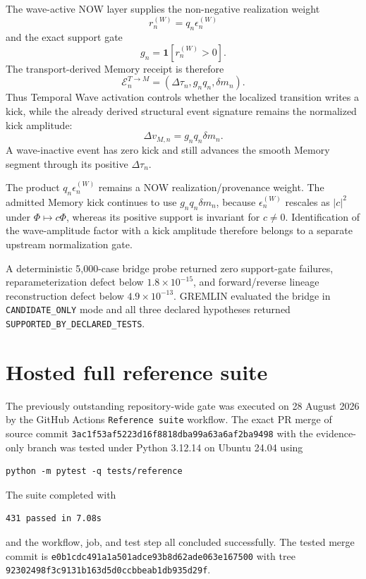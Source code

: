 \documentclass[11pt]{book}
\begin{document}
The wave-active NOW layer supplies the non-negative realization weight
\[
r_n^{(W)}=q_n\epsilon_n^{(W)}
\]
and the exact support gate
\[
g_n=\mathbf 1[r_n^{(W)}>0].
\]
The transport-derived Memory receipt is therefore
\[
\boxed{
\mathcal E_n^{T\to M}
=(\Delta\tau_n,g_nq_n,\delta m_n).
}
\]
Thus Temporal Wave activation controls whether the localized transition writes a kick, while the already derived structural event signature remains the normalized kick amplitude:
\[
\boxed{
\Delta v_{M,n}=g_nq_n\delta m_n.
}
\]
A wave-inactive event has zero kick and still advances the smooth Memory segment through its positive \(\Delta\tau_n\).

The product \(q_n\epsilon_n^{(W)}\) remains a NOW realization/provenance weight. The admitted Memory kick continues to use \(g_nq_n\delta m_n\), because \(\epsilon_n^{(W)}\) rescales as \(|c|^2\) under \(\Phi\mapsto c\Phi\), whereas its positive support is invariant for \(c\neq0\). Identification of the wave-amplitude factor with a kick amplitude therefore belongs to a separate upstream normalization gate.

A deterministic 5,000-case bridge probe returned zero support-gate failures, reparameterization defect below \(1.8\times10^{-15}\), and forward/reverse lineage reconstruction defect below \(4.9\times10^{-13}\). GREMLIN evaluated the bridge in \texttt{CANDIDATE\_ONLY} mode and all three declared hypotheses returned \texttt{SUPPORTED\_BY\_DECLARED\_TESTS}.

\section{Hosted full reference suite}

The previously outstanding repository-wide gate was executed on 28 August 2026 by the GitHub Actions \texttt{Reference suite} workflow. The exact PR merge of source commit
\texttt{3ac1f53af5223d16f8818dba99a63a6af2ba9498}
with the evidence-only branch was tested under Python 3.12.14 on Ubuntu 24.04 using
\begin{verbatim}
python -m pytest -q tests/reference
\end{verbatim}
The suite completed with
\begin{verbatim}
431 passed in 7.08s
\end{verbatim}
and the workflow, job, and test step all concluded successfully. The tested merge commit is
\texttt{e0b1cdc491a1a501adce93b8d62ade063e167500}
with tree
\texttt{92302498f3c9131b163d5d0ccbbeab1db935d29f}.
\end{document}
